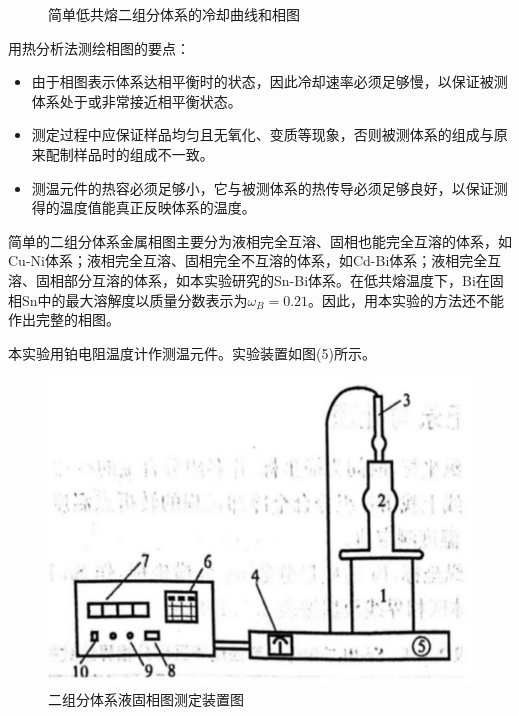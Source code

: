 \documentclass[12pt,hyperref,a4paper,UTF8]{ctexart}
\begin{document}
\begin{figure}[htp]
\centering
{}
\caption{简单低共熔二组分体系的冷却曲线和相图}
\label{1}
\end{figure}

用热分析法测绘相图的要点：
\begin{itemize}
    \item 由于相图表示体系达相平衡时的状态，因此冷却速率必须足够慢，以保证被测体系处于或非常接近相平衡状态。
\item 测定过程中应保证样品均匀且无氧化、变质等现象，否则被测体系的组成与原来配制样品时的组成不一致。
\item 测温元件的热容必须足够小，它与被测体系的热传导必须足够良好，以保证测得的温度值能真正反映体系的温度。
\end{itemize}

简单的二组分体系金属相图主要分为液相完全互溶、固相也能完全互溶的体系，如Cu-Ni体系；液相完全互溶、固相完全不互溶的体系，如Cd-Bi体系；液相完全互溶、固相部分互溶的体系，如本实验研究的Sn-Bi体系。在低共熔温度下，Bi在固相Sn中的最大溶解度以质量分数表示为$\omega _B=0.21$。因此，用本实验的方法还不能作出完整的相图。

本实验用铂电阻温度计作测温元件。实验装置如图(5)所示。
\begin{figure}[htp]
    \centering
    \includegraphics[width=0.5\linewidth]{仪器.png}
    \caption{二组分体系液固相图测定装置图}
    \label{fig:enter-label5}
\end{figure}
\end{document}
